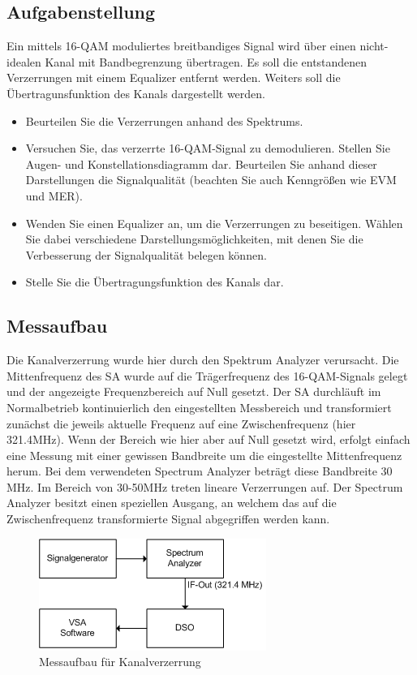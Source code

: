 \documentclass[12pt,a4paper,ngerman]{article}
\begin{document}
\subsection{Aufgabenstellung}
Ein mittels 16-QAM moduliertes breitbandiges Signal wird über einen nicht-idealen Kanal mit Bandbegrenzung übertragen. Es soll die entstandenen Verzerrungen mit einem Equalizer entfernt werden. Weiters soll die Übertragunsfunktion des Kanals dargestellt werden. 
\begin{itemize}
\item Beurteilen Sie die Verzerrungen anhand des Spektrums.
\item Versuchen Sie, das verzerrte 16-QAM-Signal zu demodulieren. Stellen Sie Augen- und Konstellationsdiagramm dar. Beurteilen Sie anhand dieser Darstellungen die Signalqualität (beachten Sie auch Kenngrößen wie EVM und MER).
\item Wenden Sie einen Equalizer an, um die Verzerrungen zu beseitigen. Wählen Sie dabei verschiedene Darstellungsmöglichkeiten, mit denen Sie die Verbesserung der Signalqualität belegen können. 
\item Stelle Sie die Übertragungsfunktion des Kanals dar. 
\end{itemize}

\subsection{Messaufbau}
Die Kanalverzerrung wurde hier durch den Spektrum Analyzer verursacht. Die Mittenfrequenz des SA wurde auf die Trägerfrequenz des 16-QAM-Signals gelegt und der angezeigte Frequenzbereich auf Null gesetzt. Der SA durchläuft im Normalbetrieb kontinuierlich den eingestellten Messbereich und transformiert zunächst die jeweils aktuelle Frequenz auf eine Zwischenfrequenz (hier 321.4MHz). Wenn der Bereich wie hier aber auf Null gesetzt wird, erfolgt einfach eine Messung mit einer gewissen Bandbreite um die eingestellte Mittenfrequenz herum. Bei dem verwendeten Spectrum Analyzer beträgt diese Bandbreite 30 MHz. Im Bereich von 30-50MHz treten lineare Verzerrungen auf. Der Spectrum Analyzer besitzt einen speziellen Ausgang, an welchem das auf die Zwischenfrequenz transformierte Signal abgegriffen werden kann. 
\begin{figure}[H]
\centering
\includegraphics[scale = 1]{figures/uebung2_schaltung.png} 
\caption{Messaufbau für Kanalverzerrung}
\end{figure}
\end{document}
